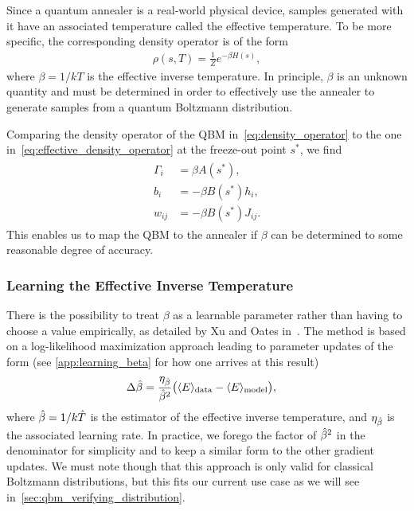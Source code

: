 Since a quantum annealer is a real-world physical device, samples generated with it have an associated temperature called the effective temperature.
To be more specific, the corresponding density operator is of the form
\begin{align}
    \rho(s, T) = \frac{1}{Z} e^{-\beta H(s)},
\label{eq:effective_density_operator}
\end{align}
where \( \beta = 1/kT \) is the effective inverse temperature.
In principle, \( \beta \) is an unknown quantity and must be determined in order to effectively use the annealer to generate samples from a quantum Boltzmann distribution.

Comparing the density operator of the QBM in~\cref{eq:density_operator} to the one in~\cref{eq:effective_density_operator} at the freeze-out point \( s^* \), we find
\begin{align}
\begin{split}
    \Gamma_i
        &= \beta A(s^*), \\
    b_i
        &= -\beta B(s^*) h_i, \\
    w_{ij}
        &= -\beta B(s^*) J_{ij}.
    \label{eq:qbm_scaling}
\end{split}
\end{align}
This enables us to map the QBM to the annealer if \( \beta \) can be determined to some reasonable degree of accuracy.

\subsubsection{Learning the Effective Inverse Temperature}\label{sec:learning_beta}
There is the possibility to treat \( \beta \) as a learnable parameter rather than having to choose a value empirically, as detailed by Xu and Oates in~\cite{xu_2021}.
The method is based on a log-likelihood maximization approach leading to parameter updates of the form (see \cref{app:learning_beta} for how one arrives at this result)
\begin{align}
    \Delta\hat{\beta}
        &= \frac{\eta_{\hat{\beta}}}{\hat{\beta}^2}\big(\langle E \rangle_\text{data} - \langle E \rangle_\text{model}\big),
\end{align}
where \( \hat{\beta} = 1/k\hat{T} \) is the estimator of the effective inverse temperature, and \( \eta_{\hat{\beta}} \) is the associated learning rate.
In practice, we forego the factor of \( \hat{\beta}^2 \) in the denominator for simplicity and to keep a similar form to the other gradient updates.
We must note though that this approach is only valid for classical Boltzmann distributions, but this fits our current use case as we will see in~\cref{sec:qbm_verifying_distribution}.

